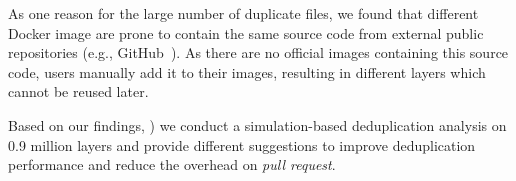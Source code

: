 As one reason for the large number of duplicate files, we found that different Docker image are prone
to contain the same source code from external public repositories (e.g., GitHub~\cite{github}). As
there are no official images containing this source code, users manually add it to their images,
resulting in different layers which cannot be reused later.  

Based on our findings, 
) 
%
we conduct a simulation-based deduplication analysis on 0.9 million layers 
and provide different suggestions to improve deduplication
performance and reduce the overhead on \textit{pull request}.
%
%
%
%
%
%



